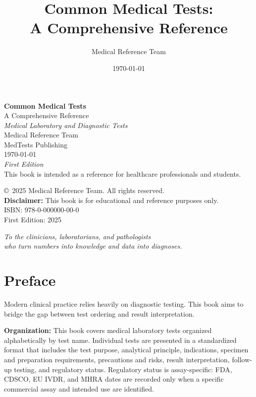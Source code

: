 \documentclass[12pt,oneside]{book}
\title{Common Medical Tests:\\ A Comprehensive Reference}
\author{Medical Reference Team}
\date{\today}
\begin{document}
\frontmatter

\begin{titlepage}
    \centering
    \vspace*{2cm}
    {\Huge \bfseries Common Medical Tests}\\[0.5cm]
    {\Large A Comprehensive Reference}\\[1.5cm]
    {\large \textit{Medical Laboratory and Diagnostic Tests}}\\[2cm]
    {\large Medical Reference Team}\\[0.5cm]
    {\normalsize MedTests Publishing}\\[1cm]
    {\today}\\[2cm]
    {\small \textit{First Edition}}\\
    \vfill
    {\footnotesize This book is intended as a reference for healthcare professionals and students.}
\end{titlepage}

\newpage
\thispagestyle{empty}
\vspace*{\fill}
\noindent \copyright\ 2025 Medical Reference Team. All rights reserved.\\[0.5cm]
\textbf{Disclaimer:} This book is for educational and reference purposes only.\\[0.5cm]
ISBN: 978-0-000000-00-0\\[0.5cm]
First Edition: 2025

\newpage
\thispagestyle{empty}
\vspace*{\fill}
\begin{center}
    \textit{To the clinicians, laboratorians, and pathologists\\
    who turn numbers into knowledge and data into diagnoses.}
\end{center}
\vspace*{\fill}

\chapter*{Preface}

Modern clinical practice relies heavily on diagnostic testing. This book aims to bridge the gap between test ordering and result interpretation.

\textbf{Organization:} This book covers medical laboratory tests organized alphabetically by test name. Individual tests are presented in a standardized format that includes the test purpose, analytical principle, indications, specimen and preparation requirements, precautions and risks, result interpretation, follow-up testing, and regulatory status. Regulatory status is assay-specific: FDA, CDSCO, EU IVDR, and MHRA dates are recorded only when a specific commercial assay and intended use are identified.
\end{document}
